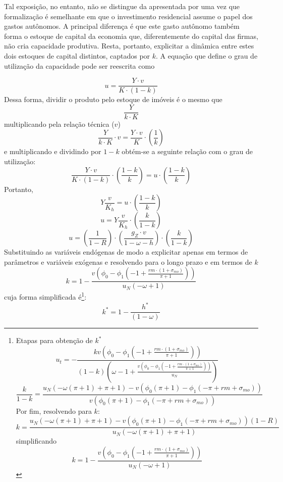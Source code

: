 
Tal exposição, no entanto, não se distingue da apresentada por \textcite{freitas_growth_2015} uma vez que formalização é semelhante em que o investimento residencial assume o papel dos gastos autônomos. A principal diferença é que este gasto autônomo também forma o estoque de capital da economia que, diferentemente do capital das firmas, não cria capacidade produtiva. Resta, portanto, explicitar a dinâmica entre estes dois estoques de capital distintos, captados por $k$. A equação que define o grau de utilização da capacidade pode ser reescrita como

$$
u = \frac{Y\cdot v}{K \cdot (1-k)}
$$
Dessa forma, dividir o produto pelo estoque de imóveis é o mesmo que
$$
\frac{Y}{k\cdot K}
$$
multiplicando pela relação técnica ($v$)
$$
\frac{Y}{k\cdot K}\cdot v = \frac{Y\cdot v}{K}\cdot \left(\frac{1}{k}\right)
$$
e multiplicando e dividindo por $1-k$ obtém-se a seguinte relação com o grau de utilização:
$$
\frac{Y\cdot v}{K\cdot (1-k)}\cdot \left(\frac{1-k}{k}\right) = u \cdot \left(\frac{1-k}{k}\right)
$$
Portanto,
$$
Y\frac{v}{K_h} =  u \cdot \left(\frac{1-k}{k}\right)
$$
$$
u = Y\frac{v}{K_h} \cdot \left(\frac{k}{1-k}\right)
$$
\begin{equation}
u = \left(\frac{1}{1-R}\right)\cdot\left(\frac{g_Z\cdot v}{1-\omega- h}\right)\cdot\left(\frac{k}{1-k}\right)
\end{equation}
Substituindo as variáveis endógenas de modo a explicitar apenas em termos de parâmetros e variáveis exógenas e resolvendo para o longo prazo e em termos de $k$
\begin{equation}
\label{kAnali}
k = 1 - \frac{v \left(\phi_{0} - \phi_{1} \left(-1 + \frac{rm\cdot(1+\sigma_{mo})}{\pi + 1}\right)\right)}{u_N \left(- \omega + 1\right)}
\end{equation}
cuja forma simplificada é\footnote{Etapas para obtenção de $k^*$
	$$
	u_t = - \frac{k v \left(\phi_{0} - \phi_{1} \left(-1 + \frac{rm\cdot(1+\sigma_{mo})}{\pi + 1}\right)\right)}{\left(1 - k\right) \left(\omega - 1 + \frac{v \left(\phi_{0} - \phi_{1} \left(-1 + \frac{rm\cdot(1+\sigma_{mo})}{\pi + 1}\right)\right)}{u_N}\right)}
	$$
	$$
	\frac{k}{1 - k} = \frac{u_N \left(- \omega \left(\pi + 1\right) + \pi + 1\right) - v \left(\phi_{0} \left(\pi + 1\right) - \phi_{1} \left(- \pi + rm + \sigma_{mo}\right)\right)}{v \left(\phi_{0} \left(\pi + 1\right) - \phi_{1} \left(- \pi + rm + \sigma_{mo}\right)\right)}
	$$
	Por fim, resolvendo para $k$:
	$$
	k = \frac{u_N \left(- \omega \left(\pi + 1\right) + \pi + 1\right) - v \left(\phi_{0} \left(\pi + 1\right) - \phi_{1} \left(- \pi + rm + \sigma_{mo}\right)\right)(1-R)}{u_N \left(- \omega \left(\pi + 1\right) + \pi + 1\right)}
	$$
simplificando
$$
k = 1 - \frac{v \left(\phi_{0} - \phi_{1} \left(-1 + \frac{rm\cdot(1+\sigma_{mo})}{\pi + 1}\right)\right)}{u_N \left(- \omega + 1\right)}
$$
}:
\begin{equation}
k^* = 1 - \frac{h^*}{(1 - \omega)}
\end{equation}


